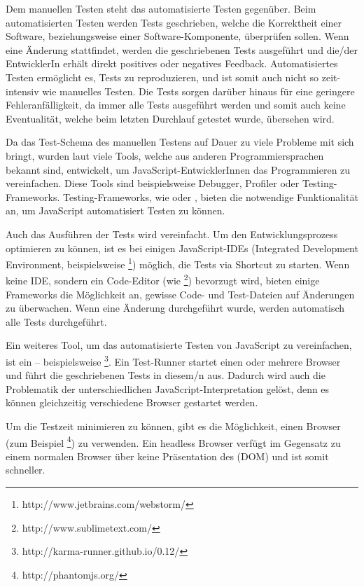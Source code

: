 Dem manuellen Testen steht das automatisierte Testen gegenüber. Beim automatisierten Testen werden Tests geschrieben, welche die Korrektheit einer Software, beziehungsweise einer Software-Komponente, überprüfen sollen. Wenn eine Änderung stattfindet, werden die geschriebenen Tests ausgeführt und die/der EntwicklerIn erhält direkt positives oder negatives Feedback. Automatisiertes Testen ermöglicht es, Tests zu reproduzieren, und ist somit auch nicht so zeit-intensiv wie manuelles Testen. Die Tests sorgen darüber hinaus für eine geringere Fehleranfälligkeit, da immer alle Tests ausgeführt werden und somit auch keine Eventualität, welche beim letzten Durchlauf getestet wurde, übersehen wird.

Da das Test-Schema des manuellen Testens auf Dauer zu viele Probleme mit sich bringt, wurden laut \cite[xix]{Johansen:2011} viele Tools, welche aus anderen Programmiersprachen bekannt sind, entwickelt, um JavaScript-EntwicklerInnen das Programmieren zu vereinfachen. Diese Tools sind beispielsweise Debugger, Profiler oder Testing-Frameworks. Testing-Frameworks, wie  oder , bieten die notwendige Funktionalität an, um JavaScript automatisiert Testen zu können.

Auch das Ausführen der Tests wird vereinfacht. Um den Entwicklungsprozess optimieren zu können, ist es bei einigen JavaScript-IDEs (Integrated Development Environment, beispielsweise \footnote{http://www.jetbrains.com/webstorm/}) möglich, die Tests via Shortcut zu starten. Wenn keine IDE, sondern ein Code-Editor (wie \footnote{http://www.sublimetext.com/}) bevorzugt wird, bieten einige Frameworks die Möglichkeit an, gewisse Code- und Test-Dateien auf Änderungen zu überwachen. Wenn eine Änderung durchgeführt wurde, werden automatisch alle Tests durchgeführt.

Ein weiteres Tool, um das automatisierte Testen von JavaScript zu vereinfachen, ist ein  -- beispielsweise \footnote{http://karma-runner.github.io/0.12/}. Ein Test-Runner startet einen oder mehrere Browser und führt die geschriebenen Tests in diesem/n aus. Dadurch wird auch die Problematik der unterschiedlichen JavaScript-Interpretation gelöst, denn es können gleichzeitig verschiedene Browser gestartet werden.

Um die Testzeit minimieren zu können, gibt es die Möglichkeit, einen  Browser (zum Beispiel \footnote{http://phantomjs.org/}) zu verwenden. Ein headless Browser verfügt im Gegensatz zu einem normalen Browser über keine Präsentation des  (DOM) und ist somit schneller.

